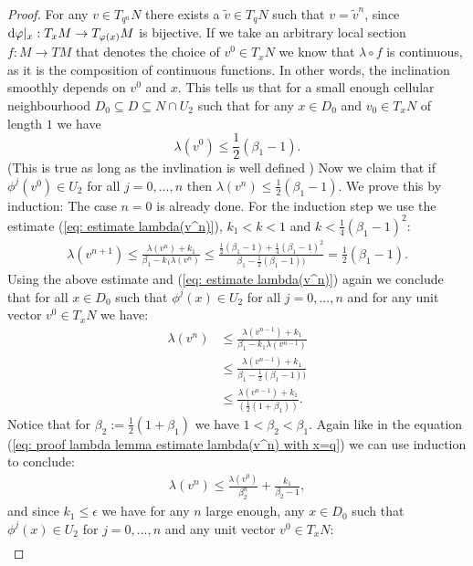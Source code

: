 \begin{proof}
	
	For any $v\in T_{q^n}N$ there exists a $\tilde{v} \in T_qN$ such that $v=\tilde{v}^n$, since
	$\mathop{}\!\mathrm{d} \varphi|_x:T_xM \to T_{\varphi(x)}M$ is bijective. 
	If we take an arbitrary local section $f:M \to TM$
	that denotes the choice of $v^0\in T_xN$ we know that $\lambda \circ f$ is continuous, 
	as it is the composition of continuous functions. In other words, the inclination smoothly depends on $v^0$ and $x$. 
	This tells us that for a small enough cellular neighbourhood $D_0 \subseteq D\subseteq N \cap U_2$ such that for any $x\in D_0$ and $v_0\in T_xN$ of length $1$ we have
	\begin{equation}
		\lambda(v^0)\leq \frac{1}{2} (\beta_1-1).
	\end{equation} (This is true as long as the invlination is well defined )
	Now we claim that if $\phi^j(v^0)\in U_2$ for all $j=0,...,n$ then $\lambda(v^n)\leq \frac{1}{2}(\beta_1-1).$ We prove this by induction: The case $n=0$ is already done. For the induction step we use the estimate (\ref{eq: estimate lambda(v^n)}), $k_1 <k<1$ and $k< \frac{1}{4}(\beta_1-1)^2$:
	\begin{align*}
		\lambda(v^{n+1})\leq \frac{\lambda(v^{n})+k_1}{ \beta_1  - k_1 \lambda(v^{n})}\leq \frac{ \frac{1}{2}(\beta_1-1)+\frac{1}{4}(\beta_1-1)^2}{ \beta_1  - \frac{1}{2}(\beta_1-1))} = \frac{1}{2}(\beta_1-1).
	\end{align*} Using the above estimate and (\ref{eq: estimate lambda(v^n)}) again we conclude that for all $x\in D_0$ such that $\phi^j(x)\in U_2$ for all $j=0,...,n$ and for any unit vector $v^0\in T_xN$ we have:
	\begin{align*}
		\lambda(v^{n})& \leq \frac{\lambda(v^{n-1})+k_1}{ \beta_1  - k_1 \lambda(v^{n-1})}\\
		&\leq \frac{\lambda(v^{n-1})+k_1}{ \beta_1  - \frac{1}{2}(\beta_1-1))}\\
		&\leq \frac{\lambda(v^{n-1})+k_1}{ (\frac{1}{2}(1+\beta_1))}.
	\end{align*} Notice that for $\beta_2:=\frac{1}{2}(1+\beta_1)$ we have $1<\beta_2<\beta_1$. Again like in the equation (\ref{eq: proof lambda lemma estimate lambda(v^n) with x=q}) we can use induction to conclude:
	\begin{align*}
		\lambda(v^n)\leq \frac{\lambda(v^0)}{\beta_2^n}+\frac{k_1}{\beta_2-1},
	\end{align*} and since $k_1\leq \epsilon$ we have for any $n$ large enough, any $x\in D_0$ such that $\phi^j(x) \in U_2$ for $j=0,...,n$ and any unit vector $v^0 \in T_xN$:
	\begin{align*}

\end{align*}
\end{proof}
